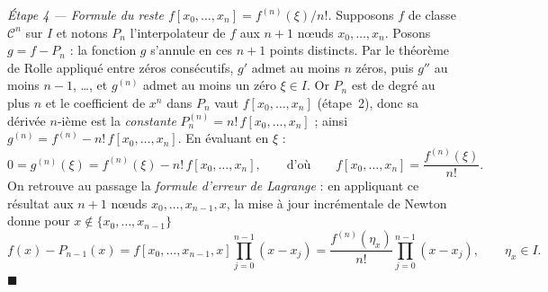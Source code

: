 \begin{mdframed}[style=proofbar]
  \medskip
  \textit{Étape 4 — Formule du reste $f[x_0,\ldots,x_n]=f^{(n)}(\xi)/n!$.}
  Supposons $f$ de classe $\mathcal{C}^{n}$ sur $I$ et notons $P_n$
  l'interpolateur de $f$ aux $n+1$ nœuds $x_0,\ldots,x_n$. Posons
  $g=f-P_n$ : la fonction $g$ s'annule en ces $n+1$ points distincts.
  Par le théorème de Rolle appliqué entre zéros consécutifs, $g'$ admet
  au moins $n$ zéros, puis $g''$ au moins $n-1$, \ldots, et $g^{(n)}$
  admet au moins un zéro $\xi\in I$. Or $P_n$ est de degré au plus $n$ et
  le coefficient de $x^n$ dans $P_n$ vaut $f[x_0,\ldots,x_n]$
  (étape~2), donc sa dérivée
  $n$-ième est la \emph{constante} $P_n^{(n)}=n!\,f[x_0,\ldots,x_n]$ ;
  ainsi $g^{(n)}=f^{(n)}-n!\,f[x_0,\ldots,x_n]$. En évaluant en $\xi$ :
  \[
    0 = g^{(n)}(\xi) = f^{(n)}(\xi)-n!\,f[x_0,\ldots,x_n],
    \qquad\text{d'où}\qquad
    f[x_0,\ldots,x_n] = \frac{f^{(n)}(\xi)}{n!}.
  \]
  On retrouve au passage la \emph{formule d'erreur de Lagrange} : en
  appliquant ce résultat aux $n+1$ nœuds $x_0,\ldots,x_{n-1},x$, la mise à
  jour incrémentale de Newton donne pour $x\notin\{x_0,\ldots,x_{n-1}\}$
  \[
    f(x)-P_{n-1}(x)
    = f[x_0,\ldots,x_{n-1},x]\prod_{j=0}^{n-1}(x-x_j)
    = \frac{f^{(n)}(\eta_x)}{n!}\prod_{j=0}^{n-1}(x-x_j),
    \qquad \eta_x\in I.
  \]
  \hfill$\blacksquare$
\end{mdframed}

\decsep{}



